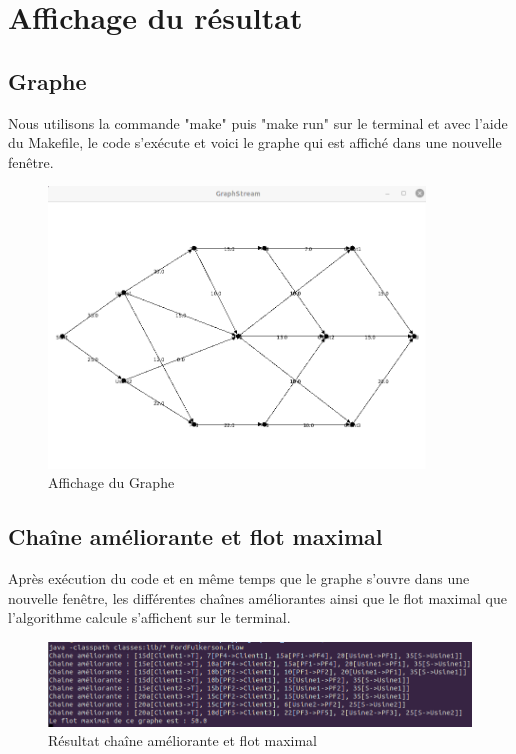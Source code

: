 \documentclass{article}
\begin{document}
\section{Affichage du résultat}

\subsection{Graphe}

Nous utilisons la commande "make" puis "make run" sur le terminal et avec l'aide du Makefile, le code s'exécute et voici le graphe qui est affiché dans une nouvelle fenêtre.

\begin{figure}[!ht]
    \center
    \includegraphics[width=10cm]{./images/Graphe.png}
    \caption{Affichage du Graphe}
\end{figure}

\subsection{Chaîne améliorante et flot maximal}

Après exécution du code et en même temps que le graphe s'ouvre dans une nouvelle fenêtre, les différentes chaînes améliorantes ainsi que le flot maximal que l'algorithme calcule s'affichent sur le terminal.

\begin{figure}[!ht]
    \center
    \includegraphics[width=12cm]{./images/Terminal.png}
    \caption{Résultat chaîne améliorante et flot maximal}
\end{figure}
\end{document}
